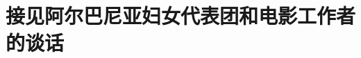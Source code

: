 \section[接见阿尔巴尼亚妇女代表团和电影工作者的谈话（一九六四年五月十五日）]{接见阿尔巴尼亚妇女代表团和电影工作者的谈话}

\begin{list}{}{
    \setlength{\topsep}{0pt}        %
    \setlength{\partopsep}{0pt}     %
    \setlength{\parsep}{\parskip}   %
    \setlength{\itemsep}{\lineskip}       %
    \setlength{\labelsep}{0pt}%
    \setlength{\labelwidth}{3em}%
    \setlength{\itemindent}{0pt}%
    \setlength\listparindent{\parindent}
    \setlength{\leftmargin}{3em}
    \setlength{\rightmargin}{0pt}
    }


\end{list}
